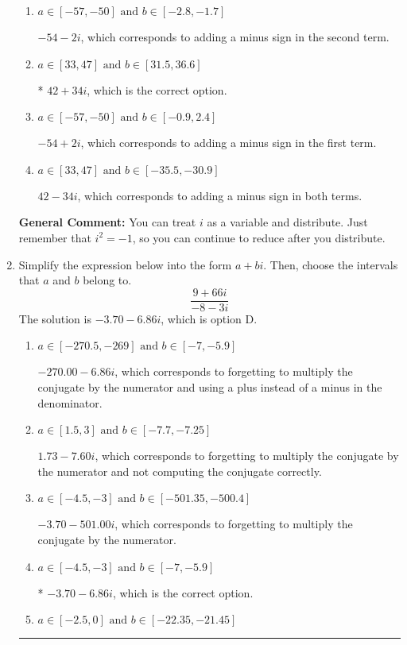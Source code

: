 \documentclass{extbook}[14pt]
\newcommand{\litem}[1]{\item #1

\rule{\textwidth}{0.4pt}}
\begin{document}
\begin{enumerate}
{\begin{enumerate}[label=\Alph*.]
 $-6 - 48 i$, which corresponds to just multiplying the real terms to get the real part of the solution and the coefficients in the complex terms to get the complex part.
\item \( a \in [-57, -50] \text{ and } b \in [-2.8, -1.7] \)

 $-54 - 2 i$, which corresponds to adding a minus sign in the second term.
\item \( a \in [33, 47] \text{ and } b \in [31.5, 36.6] \)

* $42 + 34 i$, which is the correct option.
\item \( a \in [-57, -50] \text{ and } b \in [-0.9, 2.4] \)

 $-54 + 2 i$, which corresponds to adding a minus sign in the first term.
\item \( a \in [33, 47] \text{ and } b \in [-35.5, -30.9] \)

 $42 - 34 i$, which corresponds to adding a minus sign in both terms.
\end{enumerate}

\textbf{General Comment:} You can treat $i$ as a variable and distribute. Just remember that $i^2=-1$, so you can continue to reduce after you distribute.
}
\litem{
Simplify the expression below into the form $a+bi$. Then, choose the intervals that $a$ and $b$ belong to.
\[ \frac{9 + 66 i}{-8 - 3 i} \]The solution is \( -3.70  - 6.86 i \), which is option D.\begin{enumerate}[label=\Alph*.]
\item \( a \in [-270.5, -269] \text{ and } b \in [-7, -5.9] \)

 $-270.00  - 6.86 i$, which corresponds to forgetting to multiply the conjugate by the numerator and using a plus instead of a minus in the denominator.
\item \( a \in [1.5, 3] \text{ and } b \in [-7.7, -7.25] \)

 $1.73  - 7.60 i$, which corresponds to forgetting to multiply the conjugate by the numerator and not computing the conjugate correctly.
\item \( a \in [-4.5, -3] \text{ and } b \in [-501.35, -500.4] \)

 $-3.70  - 501.00 i$, which corresponds to forgetting to multiply the conjugate by the numerator.
\item \( a \in [-4.5, -3] \text{ and } b \in [-7, -5.9] \)

* $-3.70  - 6.86 i$, which is the correct option.
\item \( a \in [-2.5, 0] \text{ and } b \in [-22.35, -21.45] \)


\end{enumerate}}
\end{enumerate}
\end{document}
